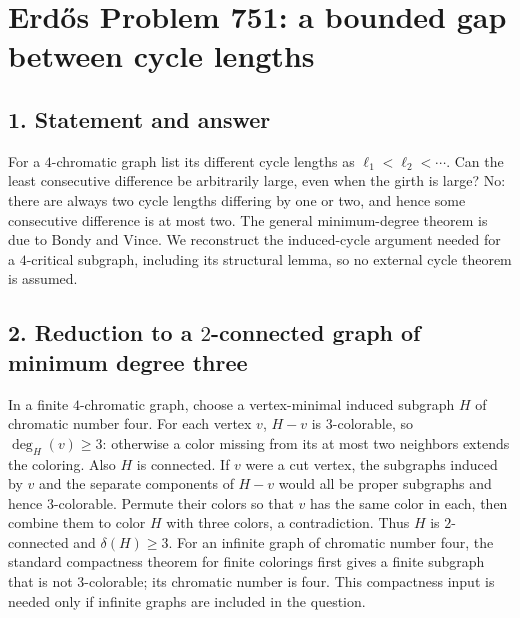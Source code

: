 \section*{Erd\H{o}s Problem 751: a bounded gap between cycle lengths}
\subsection*{1. Statement and answer}
For a $4$-chromatic graph list its different cycle lengths as $\ell_1<\ell_2<\cdots$. Can the least consecutive difference be arbitrarily large, even when the girth is large? No: there are always two cycle lengths differing by one or two, and hence some consecutive difference is at most two.
The general minimum-degree theorem is due to Bondy and Vince. We reconstruct the induced-cycle argument needed for a $4$-critical subgraph, including its structural lemma, so no external cycle theorem is assumed.
\subsection*{2. Reduction to a $2$-connected graph of minimum degree three}
In a finite $4$-chromatic graph, choose a vertex-minimal induced subgraph $H$ of chromatic number four. For each vertex $v$, $H-v$ is $3$-colorable, so $\deg_H(v)\ge3$: otherwise a color missing from its at most two neighbors extends the coloring. Also $H$ is connected. If $v$ were a cut vertex, the subgraphs induced by $v$ and the separate components of $H-v$ would all be proper subgraphs and hence $3$-colorable. Permute their colors so that $v$ has the same color in each, then combine them to color $H$ with three colors, a contradiction. Thus $H$ is $2$-connected and $\delta(H)\ge3$.
For an infinite graph of chromatic number four, the standard compactness theorem for finite colorings first gives a finite subgraph that is not $3$-colorable; its chromatic number is four. This compactness input is needed only if infinite graphs are included in the question.
